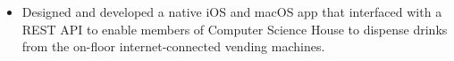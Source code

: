 \documentclass[10pt,letter,ragged2e]{altacv}
\begin{document}





\begin{itemize}
  \item Designed and developed a native iOS and macOS app that interfaced with a REST API to enable members of Computer Science House to dispense drinks from the on-floor internet-connected vending machines. 
\end{itemize}
%

\clearpage
\end{document}
